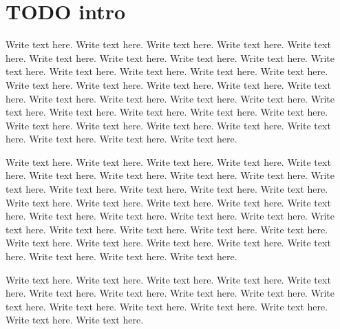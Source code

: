 \section{TODO intro}

Write text here.  Write text here.  Write text here.  Write text here.
Write text here.  Write text here.  Write text here.  Write text here.
Write text here.  Write text here.  Write text here.  Write text here.
Write text here.  Write text here.  Write text here.  Write text here.
Write text here.  Write text here.  Write text here.  Write text here.
Write text here.  Write text here.  Write text here.  Write text here.
Write text here.  Write text here.  Write text here.  Write text here.
Write text here.  Write text here.  Write text here.  Write text here.
Write text here.  Write text here.  Write text here.  Write text here.

Write text here.  Write text here.  Write text here.  Write text here.
Write text here.  Write text here.  Write text here.  Write text here.
Write text here.  Write text here.  Write text here.  Write text here.
Write text here.  Write text here.  Write text here.  Write text here.
Write text here.  Write text here.  Write text here.  Write text here.
Write text here.  Write text here.  Write text here.  Write text here.
Write text here.  Write text here.  Write text here.  Write text here.
Write text here.  Write text here.  Write text here.  Write text here.
Write text here.  Write text here.  Write text here.  Write text here.

Write text here.  Write text here.  Write text here.  Write text here.
Write text here.  Write text here.  Write text here.  Write text here.
Write text here.  Write text here.  Write text here.  Write text here.
Write text here.  Write text here.  Write text here.  Write text here.
